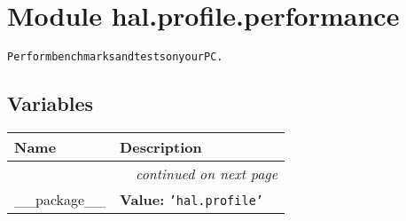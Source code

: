 %
%
%


\section{Module hal.profile.performance}

    \label{hal:profile:performance}
\begin{alltt}
Perform benchmarks and tests on your PC. 
\end{alltt}



  \subsection{Variables}

    \vspace{-1cm}
\hspace{\varindent}\begin{longtable}{|p{\varnamewidth}|p{\vardescrwidth}|l}
\cline{1-2}
\cline{1-2} \centering \textbf{Name} & \centering \textbf{Description}& \\
\cline{1-2}
\endhead\cline{1-2}\multicolumn{3}{r}{\small\textit{continued on next page}}\\\endfoot\cline{1-2}
\endlastfoot\raggedright \_\-\_\-p\-a\-c\-k\-a\-g\-e\-\_\-\_\- & \raggedright \textbf{Value:} 
{\tt \texttt{'}\texttt{hal.profile}\texttt{'}}&\\
\cline{1-2}
\end{longtable}



